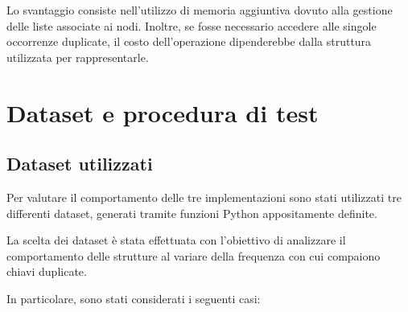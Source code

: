 \documentclass[a4paper,12pt]{article}
\begin{document}
Lo svantaggio consiste nell'utilizzo di memoria aggiuntiva dovuto alla gestione delle liste associate ai nodi. Inoltre, se fosse necessario accedere alle singole occorrenze duplicate, il costo dell'operazione dipenderebbe dalla struttura utilizzata per rappresentarle.

\section{Dataset e procedura di test}

\subsection{Dataset utilizzati}

Per valutare il comportamento delle tre implementazioni sono stati utilizzati tre differenti dataset, generati tramite funzioni Python appositamente definite.

La scelta dei dataset è stata effettuata con l'obiettivo di analizzare il comportamento delle strutture al variare della frequenza con cui compaiono chiavi duplicate.

In particolare, sono stati considerati i seguenti casi:
\end{document}

